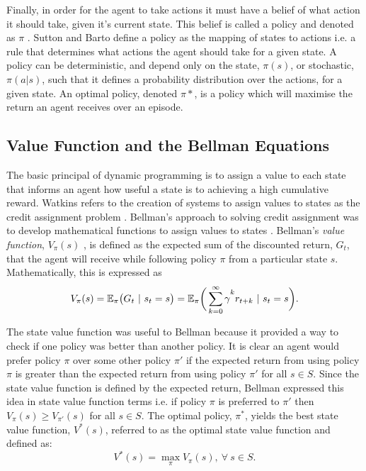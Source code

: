 Finally, in order for the agent to take actions it must have a belief of what action it should take, given it's current state. This belief is called a policy and denoted as $\pi$ \cite{Sutton2018}. Sutton and Barto define a  policy as the mapping of states to actions i.e. a rule that determines what actions the agent should take for a given state. A policy can be deterministic, and depend only on the state, $\pi(s)$, or stochastic, $\pi(a|s)$, such that it defines a probability distribution over the actions, for a given state. An optimal policy, denoted $\pi*$, is a policy which will maximise the return an agent receives over an episode.


\subsection{Value Function and the Bellman Equations}
The basic principal of dynamic programming is to assign a value to each state that informs an agent how useful a state is to achieving a high cumulative reward. Watkins refers to the creation of systems to assign values to states as the credit assignment problem \cite{Watkins1989}. Bellman's approach to solving credit assignment was to develop mathematical functions to assign values to states \cite{Bellm1954}. Bellman's \textit{value function}, $V_{\pi}(s)$ , is defined as the expected sum of the discounted return, $G_t$, that the agent will receive while following policy $\pi$ from a particular state $s$. Mathematically, this is expressed as
\begin{equation}
	V_{\pi}(s) = \mathbb{E}_{\pi} \big( G_t \ | \ s_t = s \big) = \mathbb{E}_{\pi} \bigg( \sum_{k = 0}^{\infty} \gamma\mystrut^k r_{t+k} \ | \ s_t = s \bigg). \label{eq:205}
\end{equation}

The state value function was useful to Bellman because it provided a way to check if one policy was better than another policy. It is clear an agent would prefer policy $\pi$ over some other policy $\pi'$ if the expected return from using policy $\pi$ is greater than the expected return from using policy $\pi'$ for all $s \in S$. Since the state value function is defined by the expected return, Bellman expressed this idea in state value function terms i.e. if policy $\pi$ is preferred to $\pi'$ then $V_{\pi}(s) \geq V_{\pi'}(s)$ for all $s \in S$. The optimal policy, $\pi^*$, yields the best state value function, $V^*(s)$, referred to as the optimal state value function and defined as:
\begin{equation}
	V^*(s) = \max_{\pi} V_{\pi}(s), \ \forall \ s \in S.
\end{equation}

